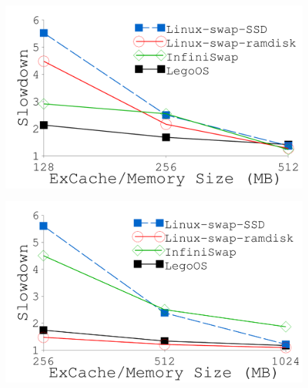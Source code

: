 {
\begin{figure}[th]
\begin{minipage}{0.50\columnwidth}
\begin{center}
\centerline{\includegraphics[width=1.0\columnwidth]{Figures/g_plot_LEGO_tf4.pdf}}
\vspace{-0.1in}
{
}
\end{center}
\end{minipage}
\begin{minipage}{0.50\columnwidth}
\begin{center}
\centerline{\includegraphics[width=1.0\columnwidth]{Figures/g_plot_LEGO_phoenix.pdf}}
\vspace{-0.1in}
{
}
\end{center}
\end{minipage}
\end{figure}}
